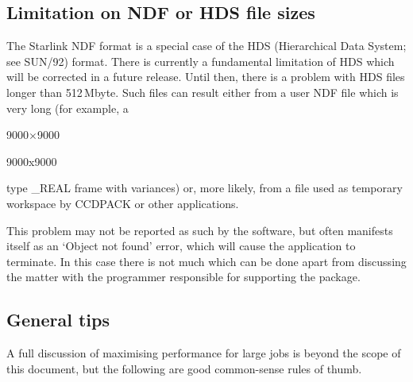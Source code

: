 \documentclass[twoside,11pt]{article}
\newcommand{\xref}[3]{#1}
\newcommand{\xlabel}[1]{}
\begin{document}
\subsection{\xlabel{HDS-LIMIT}Limitation on NDF or HDS file sizes}

The Starlink NDF format is a special case of the HDS (Hierarchical Data
System; see \xref{SUN/92}{sun92}{}\cite{SUN92}) format.
There is currently a fundamental limitation of HDS which will be corrected
in a future release.
Until then, there is a problem with HDS files longer than 512\,Mbyte. 
Such files can result either from a user NDF file which is very long 
(for example, a 
\begin{latex} 
9000$\times$9000 
\end{latex}
\begin{htmlonly} 
9000x9000 
\end{htmlonly}
type \_REAL frame with variances) or, more likely,
from a file used as temporary workspace by CCDPACK or other applications.

This problem may not be reported as such by the software,
but often manifests itself as an `Object not found' error,
which will cause the application to terminate.
In this case there is not much which can be done apart from
discussing the matter with the programmer 
responsible for supporting the package.

\subsection{\xlabel{LARGE-GENERAL}General tips}

A full discussion of maximising performance for large jobs 
is beyond the scope of this document, 
but the following are good common-sense rules of thumb.
\end{document}
